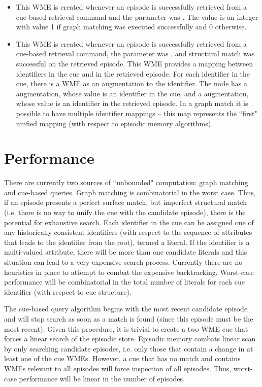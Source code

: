 \begin{itemize}
\item {}
	This WME is created whenever an episode is successfully retrieved from a cue-based retrieval command and the  parameter was . The value is an integer with value 1 if graph matching was executed successfully and 0 otherwise.
\item {}
	This WME is created whenever an episode is successfully retrieved from a cue-based retrieval command, the  parameter was , and structural match was successful on the retrieved episode. This WME provides a mapping between identifiers in the cue and in the retrieved episode. For each identifier in the cue, there is a  WME as an augmentation to the  identifier. The node has a  augmentation, whose value is an identifier in the cue, and a  augmentation, whose value is an identifier in the retrieved episode. In a graph match it is possible to have multiple identifier mappings -- this map represents the ``first" unified mapping (with respect to episodic memory algorithms).
\end{itemize}

\section{Performance}
\label{EPMEM-perf}

There are currently two sources of ``unbounded" computation: graph matching and cue-based queries.  
Graph matching is combinatorial in the worst case.  
Thus, if an episode presents a perfect surface match, but imperfect structural match (i.e. there is no way to unify the cue with the candidate episode), there is the potential for exhaustive search.  
Each identifier in the cue can be assigned one of any historically consistent identifiers (with respect to the sequence of attributes that leads to the identifier from the root), termed a literal.  
If the identifier is a multi-valued attribute, there will be more than one candidate literals and this situation can lead to a very expensive search process.  
Currently there are no heuristics in place to attempt to combat the expensive backtracking.  
Worst-case performance will be combinatorial in the total number of literals for each cue identifier (with respect to cue structure).

The cue-based query algorithm begins with the most recent candidate episode and will stop search as soon as a match is found (since this episode must be the most recent).  
Given this procedure, it is trivial to create a two-WME cue that forces a linear search of the episodic store. 
Episodic memory combats linear scan by only searching candidate episodes, i.e. only those that contain a change in at least one of the cue WMEs.  
However, a cue that has no match and contains WMEs relevant to all episodes will force inspection of all episodes.  
Thus, worst-case performance will be linear in the number of episodes. 

